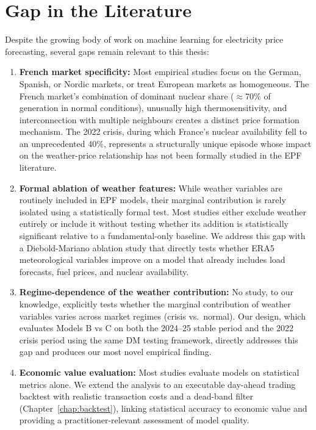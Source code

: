 \section{Gap in the Literature}

Despite the growing body of work on machine learning for electricity price
forecasting, several gaps remain relevant to this thesis:

\begin{enumerate}
  \item \textbf{French market specificity:} Most empirical studies focus on the
  German, Spanish, or Nordic markets, or treat European markets as homogeneous.
  The French market's combination of dominant nuclear share ($\approx$70\% of
  generation in normal conditions), unusually high thermosensitivity, and
  interconnection with multiple neighbours creates a distinct price formation
  mechanism. The 2022 crisis, during which France's nuclear availability fell
  to an unprecedented 40\%, represents a structurally unique episode whose
  impact on the weather-price relationship has not been formally studied in the
  EPF literature.

  \item \textbf{Formal ablation of weather features:} While weather variables
  are routinely included in EPF models, their marginal contribution is rarely
  isolated using a statistically formal test. Most studies either exclude
  weather entirely or include it without testing whether its addition is
  statistically significant relative to a fundamental-only baseline. We address
  this gap with a Diebold-Mariano ablation study that directly tests whether
  ERA5 meteorological variables improve on a model that already includes load
  forecasts, fuel prices, and nuclear availability.

  \item \textbf{Regime-dependence of the weather contribution:} No study, to
  our knowledge, explicitly tests whether the marginal contribution of weather
  variables varies across market regimes (crisis vs.\ normal). Our design,
  which evaluates Models B vs C on both the 2024--25 stable period and the 2022
  crisis period using the same DM testing framework, directly addresses this gap
  and produces our most novel empirical finding.

  \item \textbf{Economic value evaluation:} Most studies evaluate models on
  statistical metrics alone. We extend the analysis to an executable day-ahead
  trading backtest with realistic transaction costs and a dead-band filter
  (Chapter~\ref{chap:backtest}), linking statistical accuracy to economic value
  and providing a practitioner-relevant assessment of model quality.
\end{enumerate}
